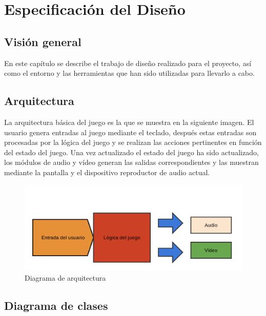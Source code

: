 \chapter{Especificación del Diseño}

\section{Visión general}

	En este capítulo se describe el trabajo de diseño realizado para el proyecto, así como el entorno y las herramientas que han sido utilizadas para llevarlo a cabo.

\section{Arquitectura}

	La arquitectura básica del juego es la que se muestra en la siguiente imagen. El usuario genera entradas al juego mediante el teclado, después estas entradas son procesadas por la lógica del juego y se realizan las acciones pertinentes en función del estado del juego. Una vez actualizado el estado del juego ha sido actualizado, los módulos de audio y vídeo generan las salidas correspondientes y las muestran mediante la pantalla y el dispositivo reproductor de audio actual.

	\begin{figure}[!htp]
		 \centering
		 \includegraphics[scale=.15]{fig/architecture}
		 \caption{Diagrama de arquitectura}
		 \label{fig:arch}
	\end{figure}

	\FloatBarrier
	\clearpage

\section{Diagrama de clases}

